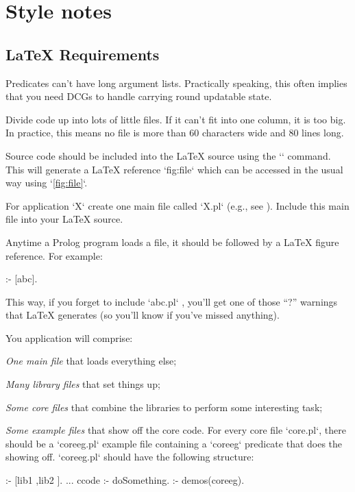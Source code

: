 \section{Style notes}

\subsection{{\LaTeX} Requirements}

Predicates can't have long argument lists. Practically speaking,
this often implies that you need DCGs to handle carrying round
updatable state.

Divide code up into lots of little files. If it can't fit into one
column, it is too big. In practice, this means  no file is more than
60 characters wide and 80 lines long.

Source code should be included into the {\LaTeX} source using the
`` command. This will generate a {\LaTeX}
reference `fig:file` which can be accessed in the usual way using
`\ref{fig:file}`.

For application `X` create one main file called `X.pl` (e.g., see
). Include this main file into your {\LaTeX} source.

Anytime a Prolog program loads a file, it should be followed by a
{\LaTeX} figure reference. For example:
\newcommand{\bslash}{$\backslash$}

\begin{LISTING}
:- [abc]. %
\end{LISTING}

This way, if you forget to include `abc.pl` , you'll get one of those
``?'' warnings that {\LaTeX} generates (so you'll know if you've
missed anything).

You application will comprise: \bi \item {\em One main file} that
loads everything else; \item {\em Many library files} that set
things up; \item {\em Some core files} that combine the libraries
to perform
 some interesting task;
 \item
 {\em Some  example files} that
show off the core code. \ei For every core file `core.pl`, there
should be a `coreeg.pl` example file containing   a `coreeg`
predicate that does the showing off. `coreeg.pl` should have  the
following structure:

\begin{LISTING}
:- [lib1 %
   ,lib2 %
   ].
...
ccode :- doSomething.
:- demos(coreeg). %
\end{LISTING}

